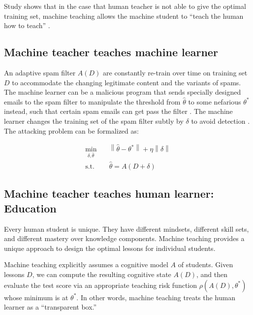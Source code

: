         Study shows that in the case that human teacher is not able to give the optimal training set,
        machine teaching allows the machine student to ``teach the human how to teach'' \cite{Suh2016}.

    \subsection{Machine teacher teaches machine learner}

        An adaptive spam filter $A(D)$ are constantly re-train over time on training set $D$ to accommodate
        the changing legitimate content and the variants of spams.
        The machine learner can be a malicious program that sends specially designed emails
        to the spam filter to manipulate the threshold from $\hat{\theta}$ to some nefarious $\theta^*$ instead,
        such that certain spam emails can get pass the filter \cite{Alfeld2016}.
        The machine learner changes the training set of the spam filter subtly by $\delta$ to avoid detection \cite{Mei2015}.
        The attacking problem can be formalized as:

        \begin{equation*}
        \begin{aligned}
            \min_{\delta, \hat{\theta}} \quad &
            \left\lVert\hat{\theta} - \theta^*\right\rVert + \eta \left\lVert\delta\right\rVert \\
            \textrm{s.t.} \quad & \hat{\theta} = A(D+\delta)
        \end{aligned}
        \end{equation*}

    \subsection{Machine teacher teaches human learner: Education}

        Every human student is unique.
        They have different mindsets, different skill sets, and different mastery over knowledge components.
        Machine teaching provides a unique approach to design the optimal lessons for individual students.

        Machine teaching explicitly assumes a cognitive model $A$ of students.
        Given lessons $D$, we can compute the resulting cognitive state $A(D)$,
        and then evaluate the test score via an appropriate teaching risk function $\rho(A(D), \theta^*)$
        whose minimum is at $\theta^*$.
        In other words, machine teaching treats the human learner as a ``transparent box.''

